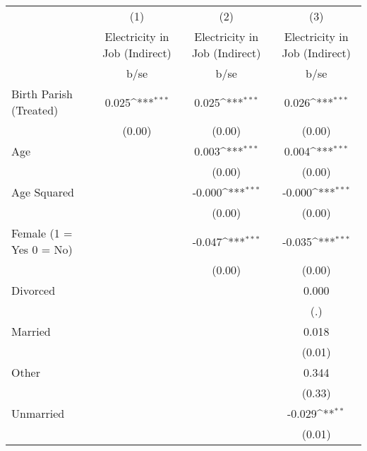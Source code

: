 {
\def\sym#1{\ifmmode^{#1}\else\(^{#1}\)\fi}
\begin{tabular}{l*{3}{c}}
\hline\hline
                    &\multicolumn{1}{c}{(1)}&\multicolumn{1}{c}{(2)}&\multicolumn{1}{c}{(3)}\\
                    &\multicolumn{1}{c}{Electricity in Job (Indirect)}&\multicolumn{1}{c}{Electricity in Job (Indirect)}&\multicolumn{1}{c}{Electricity in Job (Indirect)}\\
                    &        b/se         &        b/se         &        b/se         \\
\hline
Birth Parish (Treated)&       0.025\sym{***}&       0.025\sym{***}&       0.026\sym{***}\\
                    &      (0.00)         &      (0.00)         &      (0.00)         \\
Age                 &                     &       0.003\sym{***}&       0.004\sym{***}\\
                    &                     &      (0.00)         &      (0.00)         \\
Age Squared         &                     &      -0.000\sym{***}&      -0.000\sym{***}\\
                    &                     &      (0.00)         &      (0.00)         \\
Female (1 = Yes 0 = No)&                     &      -0.047\sym{***}&      -0.035\sym{***}\\
                    &                     &      (0.00)         &      (0.00)         \\
Divorced            &                     &                     &       0.000         \\
                    &                     &                     &         (.)         \\
Married             &                     &                     &       0.018         \\
                    &                     &                     &      (0.01)         \\
Other               &                     &                     &       0.344         \\
                    &                     &                     &      (0.33)         \\
Unmarried           &                     &                     &      -0.029\sym{**} \\
                    &                     &                     &      (0.01)         \\

\end{tabular}}
